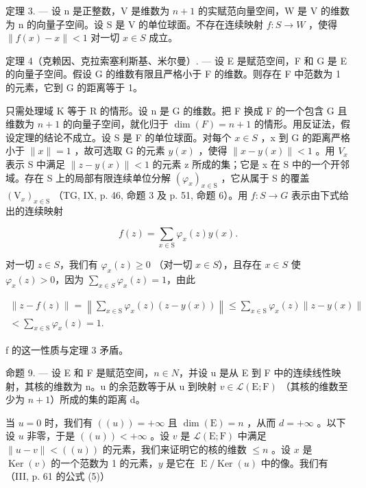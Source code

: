 定理 3. — 设 n 是正整数，V 是维数为 \(n + 1\) 的实赋范向量空间，W 是 V 的维数为 n 的向量子空间。设 S 是 V 的单位球面。不存在连续映射 \(f: S \to W\) ，使得 \(\|f(x) - x\| < 1\) 对一切 \(x \in S\) 成立。

定理 4（克赖因、克拉索塞利斯基、米尔曼）. — 设 E 是赋范空间，F 和 G 是 E 的向量子空间。假设 G 的维数有限且严格小于 F 的维数。则存在 F 中范数为 1 的元素，它到 G 的距离等于 1。

只需处理域 K 等于 R 的情形。设 n 是 G 的维数。把 F 换成 F 的一个包含 G 且维数为 \(n+1\) 的向量子空间，就化归于 \(\dim(F)=n+1\) 的情形。用反证法，假设定理的结论不成立。设 S 是 F 的单位球面。对每个 \(x\in S\) ，x 到 G 的距离严格小于 \(\|x\|=1\) ，故可选取 G 的元素 \(y(x)\) ，使得 \(\|x-y(x)\|<1\) 。用 \(V_{x}\) 表示 S 中满足 \(\|z-y(x)\|<1\) 的元素 z 所成的集；它是 x 在 S 中的一个开邻域。存在 S 上的局部有限连续单位分解 \((\varphi_{x})_{x\in\mathrm{S}}\) ，它从属于 S 的覆盖 \((\mathrm{V}_{x})_{x\in\mathrm{S}}\) （TG, IX, p. 46, 命题 3 及 p. 51, 命题 6）。用 \(f\colon S\to G\) 表示由下式给出的连续映射

\[
f (z) = \sum_ {x \in \mathrm{S}} \varphi_ {x} (z) y (x).
\]

对一切 \(z \in S\)，我们有 \(\varphi_x(z) \geqslant 0\) （对一切 \(x \in S\)），且存在 \(x \in S\) 使 \(\varphi_x(z) > 0\)，因为 \(\sum_{x \in S} \varphi_x(z) = 1\)，由此

\[
\begin{array}{c} \| z - f (z) \| = \left\| \sum_ {x \in \mathrm{S}} \varphi_ {x} (z) (z - y (x)) \right\| \leqslant \sum_ {x \in \mathrm{S}} \varphi_ {x} (z) \| z - y (x) \| \\ <   \sum_ {x \in \mathrm{S}} \varphi_ {x} (z) = 1. \end{array}
\]

f 的这一性质与定理 3 矛盾。

命题 9. — 设 E 和 F 是赋范空间，\(n \in N\)，并设 u 是从 E 到 F 中的连续线性映射，其核的维数为 n。u 的余范数等于从 u 到映射 \(v \in \mathcal{L}(\mathrm{E};\mathrm{F})\) （其核的维数至少为 \(n + 1\)）所成的集的距离 d。

当 \(u = 0\) 时，我们有 \(((u)) = +\infty\) 且 \(\dim(\mathrm{E}) = n\) ，从而 \(d = +\infty\) 。以下设 \(u\) 非零，于是 \(((u)) < +\infty\) 。设 \(v\) 是 \(\mathcal{L}(\mathrm{E};\mathrm{F})\) 中满足 \(\| u - v \| < ((u))\) 的元素，我们来证明它的核的维数 \(\leqslant n\) 。设 \(x\) 是 \(\operatorname{Ker}(v)\) 的一个范数为 1 的元素，\(y\) 是它在 \(\operatorname{E}/\operatorname{Ker}(u)\) 中的像。我们有（III, p. 61 的公式 (5)）

